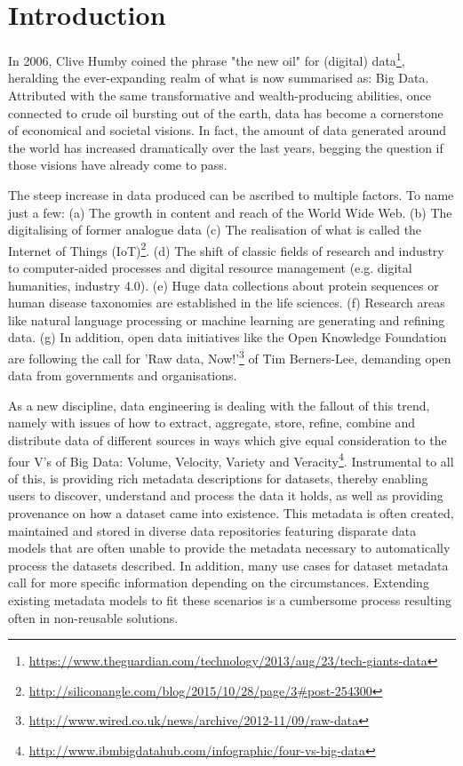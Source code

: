 \documentclass[runningheads,a4paper]{llncs}
\newcommand\footnoteurl[1]{\footnote{\scriptsize\url{#1}}}
\begin{document}
\section{Introduction}
\label{introduction}

In 2006, Clive Humby coined the phrase "the new oil" for (digital) data\footnoteurl{https://www.theguardian.com/technology/2013/aug/23/tech-giants-data}, heralding the ever-expanding realm of what is now summarised as: Big Data. Attributed with the same transformative and wealth-producing abilities, once connected to crude oil bursting out of the earth, data has become a cornerstone of economical and societal visions. In fact, the amount of data generated around the world has increased dramatically over the last years, begging the question if those visions have already come to pass.

The steep increase in data produced can be ascribed to multiple factors. To name just a few:
(a) The growth in content and reach of the World Wide Web.
(b) The digitalising of former analogue data
(c) The realisation of what is called the Internet of Things (IoT)\footnoteurl{http://siliconangle.com/blog/2015/10/28/page/3\#post-254300}.
(d) The shift of classic fields of research and industry to computer-aided processes and digital resource management (e.g. digital humanities, industry 4.0).
(e) Huge data collections about protein sequences or human disease taxonomies are established in the life sciences.
(f) Research areas like natural language processing or machine learning are generating and refining data.
(g) In addition, open data initiatives like the Open Knowledge Foundation are following the call for 'Raw data, Now!'\footnoteurl{http://www.wired.co.uk/news/archive/2012-11/09/raw-data} of Tim Berners-Lee, demanding open data from governments and organisations. %

As a new discipline, data engineering is dealing with the fallout of this trend, namely with issues of how to extract, aggregate, store, refine, combine and distribute data of different sources in ways which give equal consideration to the four V's of Big Data: Volume, Velocity, Variety and Veracity\footnoteurl{http://www.ibmbigdatahub.com/infographic/four-vs-big-data}. Instrumental to all of this, is providing rich metadata descriptions for datasets, thereby enabling users to discover, understand and process the data it holds, as well as providing provenance on how a dataset came into existence.
This metadata is often created, maintained and stored in diverse data repositories featuring disparate data models that are often unable to provide the metadata necessary to automatically process the datasets described. In addition, many use cases for dataset metadata call for more specific information depending on the circumstances. Extending existing metadata models to fit these scenarios is a cumbersome process resulting often in non-reusable solutions.
\end{document}
